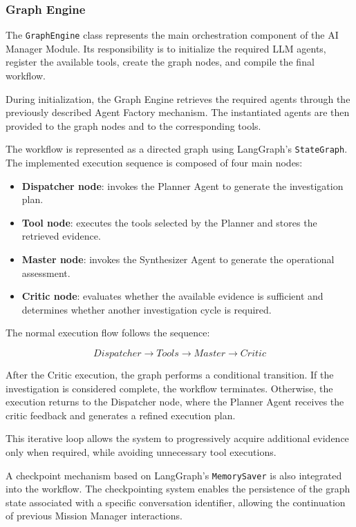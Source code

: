 \subsubsection{Graph Engine}

The \texttt{GraphEngine} class represents the main orchestration component of the AI Manager Module. Its responsibility is to initialize the required LLM agents, register the available tools, create the graph nodes, and compile the final workflow.

During initialization, the Graph Engine retrieves the required agents through the previously described Agent Factory mechanism. The instantiated agents are then provided to the graph nodes and to the corresponding tools.

The workflow is represented as a directed graph using LangGraph's \texttt{StateGraph}. The implemented execution sequence is composed of four main nodes:

\begin{itemize}
    \item \textbf{Dispatcher node}: invokes the Planner Agent to generate the investigation plan.
    \item \textbf{Tool node}: executes the tools selected by the Planner and stores the retrieved evidence.
    \item \textbf{Master node}: invokes the Synthesizer Agent to generate the operational assessment.
    \item \textbf{Critic node}: evaluates whether the available evidence is sufficient and determines whether another investigation cycle is required.
\end{itemize}

The normal execution flow follows the sequence:

\[
Dispatcher \rightarrow Tools \rightarrow Master \rightarrow Critic
\]

After the Critic execution, the graph performs a conditional transition. If the investigation is considered complete, the workflow terminates. Otherwise, the execution returns to the Dispatcher node, where the Planner Agent receives the critic feedback and generates a refined execution plan.

This iterative loop allows the system to progressively acquire additional evidence only when required, while avoiding unnecessary tool executions.

A checkpoint mechanism based on LangGraph's \texttt{MemorySaver} is also integrated into the workflow. The checkpointing system enables the persistence of the graph state associated with a specific conversation identifier, allowing the continuation of previous Mission Manager interactions.

